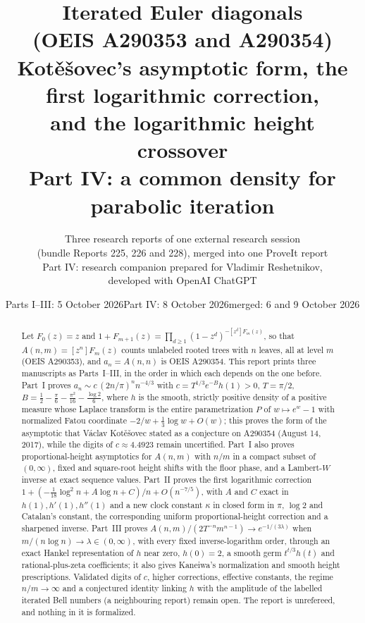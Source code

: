 \documentclass[11pt,letterpaper]{article}
\title{\textbf{Iterated Euler diagonals\\ (OEIS A290353 and A290354)}\\[7pt]
\large Kot\v{e}\v{s}ovec's asymptotic form, the first logarithmic correction,\\ and the logarithmic height crossover\\[6pt]\normalsize Part IV: a common density for parabolic iteration}
\author{Three research reports of one external research session\\(bundle Reports 225, 226 and 228), merged into one ProveIt report\\[2pt]Part IV: research companion prepared for Vladimir Reshetnikov,\\developed with OpenAI ChatGPT}
\date{Parts I--III: 5 October 2026\quad Part IV: 8 October 2026\quad merged: 6 and 9 October 2026}
\theoremstyle{remark}\newtheorem{remark}[theorem]{Remark}
\begin{document}
\hypersetup{pageanchor=false}
\maketitle
\begin{abstract}
Let $F_0(z)=z$ and $1+F_{m+1}(z)=\prod_{d\ge1}(1-z^d)^{-[z^d]F_m(z)}$, so that $A(n,m)=[z^n]F_m(z)$ counts unlabeled rooted trees with $n$ leaves, all at level $m$ (OEIS A290353), and $a_n=A(n,n)$ is OEIS A290354. This report prints three manuscripts as Parts~I--III, in the order in which each depends on the one before. Part~I proves $a_n\sim c\,(2n/\pi)^nn^{-4/3}$ with $c=T^{1/3}e^{-B}h(1)>0$, $T=\pi/2$, $B=\frac12-\frac\pi6-\frac{\pi^2}{16}-\frac{\log2}6$, where $h$ is the smooth, strictly positive density of a positive measure whose Laplace transform is the entire parametrization $P$ of $w\mapsto e^w-1$ with normalized Fatou coordinate $-2/w+\frac13\log w+O(w)$; this proves the form of the asymptotic that V\'aclav Kot\v{e}\v{s}ovec stated as a conjecture on A290354 (August 14, 2017), while the digits of $c\approx4.4923$ remain uncertified. Part~I also proves proportional-height asymptotics for $A(n,m)$ with $n/m$ in a compact subset of $(0,\infty)$, fixed and square-root height shifts with the floor phase, and a Lambert-$W$ inverse at exact sequence values. Part~II proves the first logarithmic correction $1+(-\frac{1}{18}\log^2n+A\log n+C)/n+O(n^{-7/5})$, with $A$ and $C$ exact in $h(1),h'(1),h''(1)$ and a new clock constant $\kappa$ in closed form in $\pi$, $\log2$ and Catalan's constant, the corresponding uniform proportional-height correction and a sharpened inverse. Part~III proves $A(n,m)/(2T^{-n}m^{n-1})\to e^{-1/(3\lambda)}$ when $m/(n\log n)\to\lambda\in(0,\infty)$, with every fixed inverse-logarithm order, through an exact Hankel representation of $h$ near zero, $h(0)=2$, a smooth germ $t^{t/3}h(t)$ and rational-plus-zeta coefficients; it also gives Kaneiwa's normalization and smooth height prescriptions. Validated digits of $c$, higher corrections, effective constants, the regime $n/m\to\infty$ and a conjectured identity linking $h$ with the amplitude of the labelled iterated Bell numbers (a neighbouring report) remain open. The report is unrefereed, and nothing in it is formalized.
\end{abstract}
\hypersetup{pageanchor=true}
\setcounter{tocdepth}{1}
{\small\setlength{\parskip}{0pt}\tableofcontents}
\newpage
\setlength{\parskip}{4pt}
\end{document}
